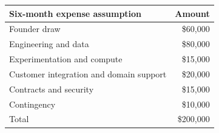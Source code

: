 \begin{tabular}{lr}
\toprule
Six-month expense assumption & Amount \\
\midrule
Founder draw & \$60,000 \\
Engineering and data & \$80,000 \\
Experimentation and compute & \$15,000 \\
Customer integration and domain support & \$20,000 \\
Contracts and security & \$15,000 \\
Contingency & \$10,000 \\
Total & \$200,000 \\
\bottomrule
\end{tabular}

